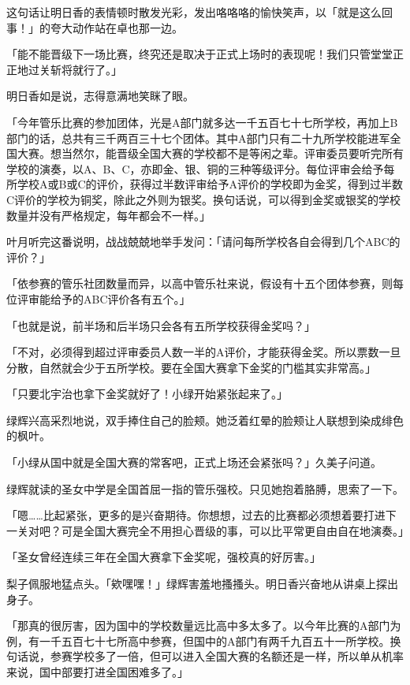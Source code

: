 \documentclass[UTF8]{ctexart}
\begin{document}
    这句话让明日香的表情顿时散发光彩，发出咯咯咯的愉快笑声，以「就是这么回事！」的夸大动作站在卓也那一边。 

    「能不能晋级下一场比赛，终究还是取决于正式上场时的表现呢！我们只管堂堂正正地过关斩将就行了。」 

    明日香如是说，志得意满地笑眯了眼。 

    「今年管乐比赛的参加团体，光是A部门就多达一千五百七十七所学校，再加上B部门的话，总共有三千两百三十七个团体。其中A部门只有二十九所学校能进军全国大赛。想当然尔，能晋级全国大赛的学校都不是等闲之辈。评审委员要听完所有学校的演奏，以A、B、C，亦即金、银、铜的三种等级评分。每位评审会给予每所学校A或B或C的评价，获得过半数评审给予A评价的学校即为金奖，得到过半数C评价的学校为铜奖，除此之外则为银奖。换句话说，可以得到金奖或银奖的学校数量并没有严格规定，每年都会不一样。」 

    叶月听完这番说明，战战兢兢地举手发问：「请问每所学校各自会得到几个ABC的评价？」 

    「依参赛的管乐社团数量而异，以高中管乐社来说，假设有十五个团体参赛，则每位评审能给予的ABC评价各有五个。」 

    「也就是说，前半场和后半场只会各有五所学校获得金奖吗？」 

    「不对，必须得到超过评审委员人数一半的A评价，才能获得金奖。所以票数一旦分散，自然就会少于五所学校。要在全国大赛拿下金奖的门槛其实非常高。」 

    「只要北宇治也拿下金奖就好了！小绿开始紧张起来了。」 

    绿辉兴高采烈地说，双手捧住自己的脸颊。她泛着红晕的脸颊让人联想到染成绯色的枫叶。 

    「小绿从国中就是全国大赛的常客吧，正式上场还会紧张吗？」久美子问道。 

    绿辉就读的圣女中学是全国首屈一指的管乐强校。只见她抱着胳膊，思索了一下。 

    「嗯……比起紧张，更多的是兴奋期待。你想想，过去的比赛都必须想着要打进下一关对吧？可是全国大赛完全不用担心晋级的事，可以比平常更自由自在地演奏。」 

    「圣女曾经连续三年在全国大赛拿下金奖呢，强校真的好厉害。」 

    梨子佩服地猛点头。「欸嘿嘿！」绿辉害羞地搔搔头。明日香兴奋地从讲桌上探出身子。 

    「那真的很厉害，因为国中的学校数量远比高中多太多了。以今年比赛的A部门为例，有一千五百七十七所高中参赛，但国中的A部门有两千九百五十一所学校。换句话说，参赛学校多了一倍，但可以进入全国大赛的名额还是一样，所以单从机率来说，国中部要打进全国困难多了。」 
\end{document}
